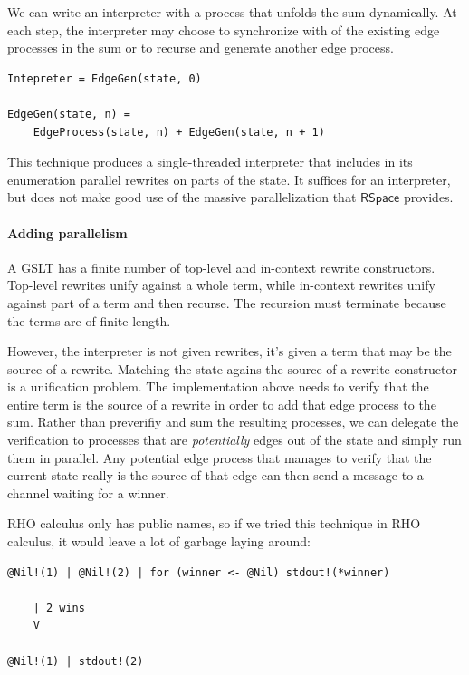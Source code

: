 \documentclass{article}
\newcommand{\RS}{\mathsf{RSpace}}
\begin{document}
We can write an interpreter with a process that unfolds the sum dynamically.  At each step, the interpreter may choose to synchronize with of the existing edge processes in the sum or to recurse and generate another edge process.

\begin{verbatim}
Intepreter = EdgeGen(state, 0)

EdgeGen(state, n) =
    EdgeProcess(state, n) + EdgeGen(state, n + 1)
\end{verbatim}

This technique produces a single-threaded interpreter that includes in its enumeration parallel rewrites on parts of the state.  It suffices for an interpreter, but does not make good use of the massive parallelization that $\RS$ provides.

\paragraph{Adding parallelism}

A GSLT has a finite number of top-level and in-context rewrite constructors.  Top-level rewrites unify against a whole term, while in-context rewrites unify against part of a term and then recurse.  The recursion must terminate because the terms are of finite length.

However, the interpreter is not given rewrites, it's given a term that may be the source of a rewrite.  Matching the state agains the source of a rewrite constructor is a unification problem.  The implementation above needs to verify that the entire term is the source of a rewrite in order to add that edge process to the sum.  Rather than preverifiy and sum the resulting processes, we can delegate the verification to processes that are {\em potentially} edges out of the state and simply run them in parallel.  Any potential edge process that manages to verify that the current state really is the source of that edge can then send a message to a channel waiting for a winner.

RHO calculus only has public names, so if we tried this technique in RHO calculus, it would leave a lot of garbage laying around:

\begin{verbatim}
@Nil!(1) | @Nil!(2) | for (winner <- @Nil) stdout!(*winner)

    | 2 wins
    V

@Nil!(1) | stdout!(2)
\end{verbatim}
\end{document}
